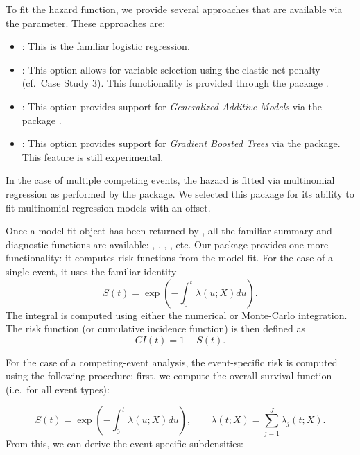 To fit the hazard function, we provide several approaches that are
available via the  parameter. These approaches are:

\begin{itemize}
\tightlist
\item
  : This is the familiar logistic regression.
\item
  : This option allows for variable selection using the
  elastic-net \citep{zou2005regularization} penalty (cf.~Case Study 3).
  This functionality is provided through the  package
  \citep{friedman2010jss}.
\item
  : This option provides support for \emph{Generalized
  Additive Models} via the  package
  \citep{hastie1987generalized}.
\item
  : This option provides support for \emph{Gradient Boosted
  Trees} via the  package. This feature is still experimental.
\end{itemize}

In the case of multiple competing events, the hazard is fitted via
multinomial regression as performed by the  package. We
selected this package for its ability to fit multinomial regression
models with an offset.

Once a model-fit object has been returned by , all
the familiar summary and diagnostic functions are available:
, , , , etc. Our
package provides one more functionality: it computes risk functions from
the model fit. For the case of a single event, it uses the familiar
identity \begin{equation}\label{eqn:surv}
S(t) = \exp\left(-\int_0^t \lambda(u;X) du\right).
\end{equation} The integral is computed using either the numerical or
Monte-Carlo integration. The risk function (or cumulative incidence
function) is then defined as \begin{equation}\label{eqn:CI}
CI(t) = 1 - S(t).
\end{equation}

For the case of a competing-event analysis, the event-specific risk is
computed using the following procedure: first, we compute the overall
survival function (i.e.~for all event types):

\[ S(t) = \exp\left(-\int_0^t \lambda(u;X) du\right),\qquad \lambda(t;X) = \sum_{j=1}^J \lambda_j(t;X).\]
From this, we can derive the event-specific subdensities:

